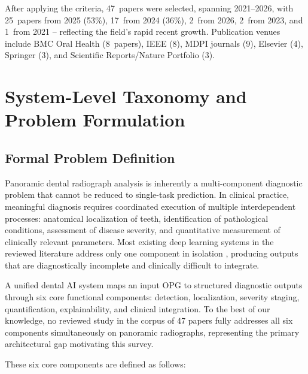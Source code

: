\documentclass[conference]{IEEEtran}
\begin{document}
After applying the criteria, 47~papers were selected, spanning 2021--2026,
with 25~papers from 2025 (53\%), 17~from 2024 (36\%), 2~from 2026,
2~from 2023, and 1~from 2021 -- reflecting the field's rapid recent
growth. Publication venues include BMC Oral Health (8~papers), IEEE (8),
MDPI journals (9), Elsevier (4), Springer (3), and Scientific
Reports/Nature Portfolio (3).

\section{System-Level Taxonomy and Problem Formulation}
\label{sec:taxonomy}

\subsection{Formal Problem Definition}

Panoramic dental radiograph analysis is inherently a multi-component
diagnostic problem that cannot be reduced to single-task prediction.
In clinical practice, meaningful diagnosis requires coordinated
execution of multiple interdependent processes: anatomical localization
of teeth, identification of pathological conditions, assessment of
disease severity, and quantitative measurement of clinically relevant
parameters. Most existing deep learning systems in the reviewed
literature address only one component in isolation
\cite{albano2024artificial,luke2025accuracy,zanini2024systematic},
producing outputs that are diagnostically incomplete and clinically
difficult to integrate.

A unified dental AI system maps an input OPG to structured diagnostic
outputs through six core functional components: detection, localization,
severity staging, quantification, explainability, and clinical
integration. To the best of our knowledge, no reviewed study in the
corpus of 47 papers fully addresses all six components simultaneously
on panoramic radiographs, representing the primary architectural gap
motivating this survey.

These six core components are defined as follows:
\end{document}
